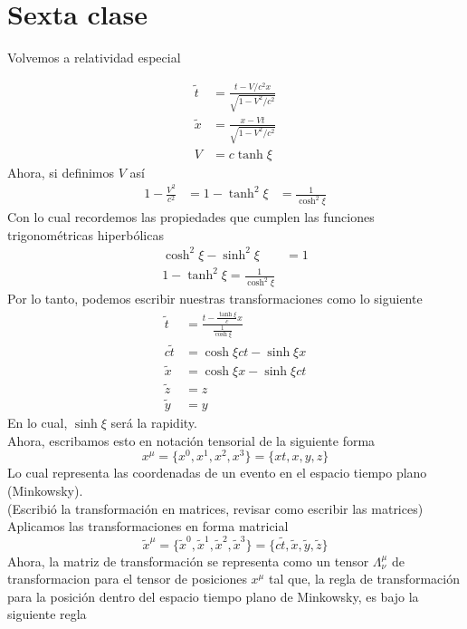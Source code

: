 \documentclass[../main.tex]{subfiles}
\begin{document}
\section{Sexta clase}
Volvemos a relatividad especial

\begin{align*}
  \tilde{t} & =\frac{t-V/c^2 x}{\sqrt{1-V^2/c^2}} \\
  \tilde{x} & =  \frac{x-Vt}{\sqrt{1-V^2/c^2}} \\
  V & = c\tanh{\xi}
\end{align*}
Ahora, si definimos $V$ así
\begin{align*}
  1-\frac{V^2}{c^2}  & = 1- \tanh^2{\xi}
  & = \frac{1}{\cosh^2{\xi}}
\end{align*}
Con lo cual recordemos las propiedades que cumplen las funciones trigonométricas hiperbólicas
\begin{align}
  \cosh^2{\xi} - \sinh^2{\xi}  & = 1 \\
  1- \tanh^2{\xi} = \frac{1}{\cosh^2{\xi}}
\end{align}
Por lo tanto, podemos escribir nuestras transformaciones como lo siguiente 
\begin{align*}
  \tilde{t} & = \frac{t-\frac{\tanh{\xi}}{c}x}{\frac{1}{\cosh{\xi}}} \\
  c\tilde{t} & = \cosh{\xi}ct - \sinh{\xi}x \\
  \tilde{x}  & = \cosh{\xi}x - \sinh{\xi}ct \\
  \tilde{z} & = z  \\
  \tilde{y} & = y
\end{align*}
En lo cual, $\sinh{\xi}$ será la rapidity. \\
Ahora, escribamos esto en notación tensorial de la siguiente forma
\begin{equation}
  x^\mu = \{ x^0,x^1,x^2,x^3 \} = \{xt,x,y,z\}
\end{equation}
Lo cual representa las coordenadas de un evento en el espacio tiempo plano (Minkowsky). \\
(Escribió la transformación en matrices, revisar como escribir las matrices) \\
Aplicamos las transformaciones en forma matricial
\begin{equation}
  \tilde{x}^\mu = \{\tilde{x}^0,\tilde{x}^1, \tilde{x}^2, \tilde{x}^3\} = \{c\tilde{t},\tilde{x},\tilde{y},\tilde{z}\} 
\end{equation}
Ahora, la matriz de transformación se representa como un tensor $\Lambda_\nu^\mu$ de transformacion para el tensor de posiciones $x^\mu$ tal que, la regla de transformación para la posición dentro del espacio tiempo plano de Minkowsky, es bajo la siguiente regla
\end{document}
